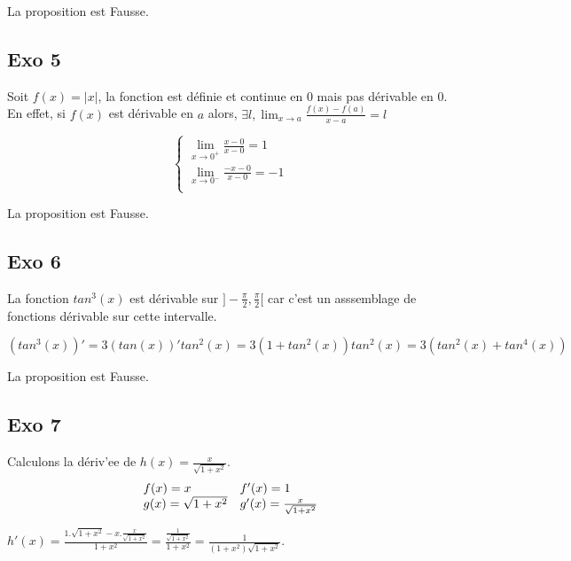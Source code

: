 \documentclass[]{book}
\theoremstyle{definition}
\begin{document}
La proposition est Fausse.\\




\subsection*{Exo 5}
Soit $f(x) = |x|$, la fonction est d\'efinie et continue en $0$ mais pas d\'erivable en $0$.
En effet, si $f(x)$ est d\'erivable en $a$ alors, $\exists l, \lim_{x \to a}\frac{f(x)-f(a)}{x-a} = l$

$$ 
\left\{ 
\begin{array}{l}
 \lim_{x \to 0^{+}} \frac{x - 0}{x-0} = 1 \\
 \lim_{x \to 0^{-}} \frac{-x - 0}{x-0} = -1 \\
\end{array}
\right. 
$$

La proposition est Fausse.

\subsection*{Exo 6}
La fonction $tan^3(x)$ est d\'erivable sur $]-\frac{\pi}{2},\frac{\pi}{2}[$ car c'est un asssemblage de fonctions d\'erivable sur cette intervalle.

$$(tan^3(x))' = 3(tan(x))'tan^2(x)=3(1+tan^2(x))tan^2(x) = 3(tan^2(x)+tan^4(x))$$

La proposition est Fausse.


\subsection*{Exo 7}
Calculons la d\'eriv'ee de $h(x) = \frac{x}{\sqrt{1+x^2}}$.
$$
\begin{array}{l l}
 f(x) = x & f'(x) = 1 \\
 g(x) = \sqrt{1+x^2} & g'(x) = \frac{x}{\sqrt{1+x^2}} \\
\end{array}
$$

$h'(x) = \frac{1.\sqrt{1+x^2} - x.\frac{x}{\sqrt{1+x^2}}}{1+x^2} = \frac{\frac{1}{\sqrt{1+x^2}}}{1+x^2} = \frac{1}{(1+x^2)\sqrt{1+x^2}}$.
\end{document}
